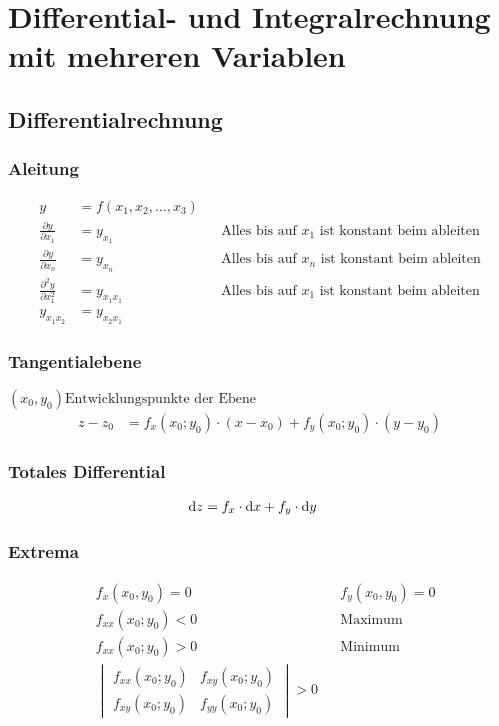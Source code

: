 \section{Differential- und Integralrechnung mit mehreren Variablen}
\subsection{Differentialrechnung}

\subsubsection*{Aleitung}
\begin{align*}
y&=f(x_1,x_2,\dots,x_3)\\
\frac{\partial y}{\partial x_1}&=y_{x_1}&&\text{Alles bis auf $x_1$ ist konstant beim ableiten}\\
\frac{\partial y}{\partial x_n}&=y_{x_n}&&\text{Alles bis auf $x_n$ ist konstant beim ableiten}\\
\frac{\partial^2 y}{\partial x_1^2}&=y_{x_1x_1}&&\text{Alles bis auf $x_1$ ist konstant beim ableiten}\\
y_{x_1x_2}&=y_{x_2x_1}
\end{align*}

\subsubsection*{Tangentialebene}
\( \left(x_0, y_0 \right) \text{Entwicklungspunkte der Ebene} \)
\begin{align*}
z-z_0&=f_x\left(x_0;y_0\right)\cdot\left(x-x_0\right)+f_y\left(x_0;y_0\right)\cdot\left(y-y_0\right)
\end{align*}

\subsubsection*{Totales Differential}
\begin{align*}
\mathop{}\!\mathrm{d} z&=f_x\cdot\mathop{}\!\mathrm{d} x+f_y\cdot\mathop{}\!\mathrm{d} y
\end{align*}

\subsubsection*{Extrema}
\begin{align*}
&f_x(x_0,y_0)=0&&f_y(x_0,y_0)=0\\
&f_{xx}(x_0;y_0)<0&&\text{Maximum}\\
&f_{xx}(x_0;y_0)>0&&\text{Minimum}\\
&\begin{vmatrix}f_{xx}(x_0;y_0)&f_{xy}(x_0;y_0)\\f_{xy}(x_0;y_0)&f_{yy}(x_0;y_0)\end{vmatrix}>0
\end{align*}

